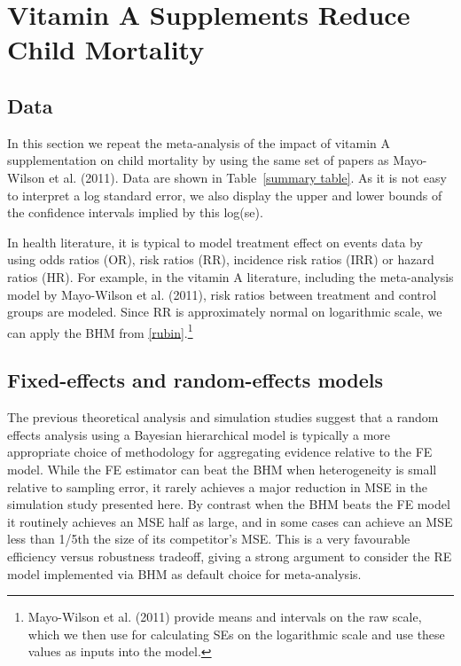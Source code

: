 \documentclass[12pt]{article}
\begin{document}
\section{Vitamin A Supplements Reduce Child Mortality}

\subsection{Data}

In this section we repeat the meta-analysis of the impact of vitamin A supplementation on child mortality by using the same set of papers as Mayo-Wilson et al. (2011). 
Data are shown in Table~\ref{summary table}. 
As it is not easy to interpret a log standard error, we also display the upper and lower bounds of the confidence intervals implied by this log(se). 

In health literature, it is typical to model treatment effect on events data by using odds ratios (OR), risk ratios (RR), incidence risk ratios (IRR) or hazard ratios (HR). For example, in the vitamin A literature, including the meta-analysis model by Mayo-Wilson et al. (2011), risk ratios between treatment and control groups are modeled. Since RR is approximately normal on logarithmic scale, we can apply the BHM from \eqref{rubin}.\footnote{Mayo-Wilson et al. (2011) provide means and intervals on the raw scale, which we then use for calculating SEs on the logarithmic scale and use these values as inputs into the model.}




\subsection{Fixed-effects and random-effects models}

The previous theoretical analysis and simulation studies suggest that a random effects analysis using a Bayesian hierarchical model is typically a more appropriate choice of methodology for aggregating evidence relative to the FE model. While the FE estimator can beat the BHM when heterogeneity is small relative to sampling error, it rarely achieves a major reduction in MSE in the simulation study presented here. By contrast when the BHM beats the FE model it routinely achieves an MSE half as large, and in some cases can achieve an MSE less than 1/5th the size of its competitor's MSE. This is a very favourable efficiency versus robustness tradeoff, giving a strong argument to consider the RE model implemented via BHM as default choice for meta-analysis. 
\end{document}
